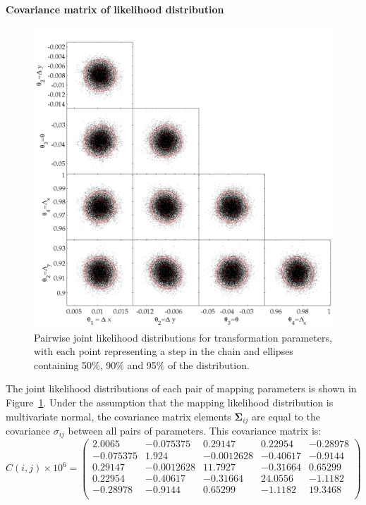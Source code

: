 \documentclass[manuscript]{aastex}
\newcommand{\bsS}{\boldsymbol\Sigma}
\begin{document}
\paragraph{Covariance matrix of likelihood distribution}
\begin{figure}[h]
\centering
\includegraphics[width=\linewidth]{figures/jointL.pdf}
\caption{Pairwise joint likelihood distributions for transformation parameters, with each point representing a step in the chain and ellipses containing 50\%, 90\% and 95\% of the distribution.}\label{fig:jointL}
\end{figure}
The joint likelihood distributions of each pair of mapping parameters is shown in Figure~\ref{fig:jointL}. Under the assumption that the mapping likelihood distribution is multivariate normal, the covariance matrix elements $\bsS_{ij}$ are equal to the covariance $\sigma_{ij}$ between all pairs of parameters. This covariance matrix is:
\[ C(i,j)\times10^6 = \left(\begin{array}{ccccc}
2.0065&-0.075375&0.29147&0.22954&-0.28978\\
-0.075375&1.924&-0.0012628&-0.40617&-0.9144\\
0.29147&-0.0012628&11.7927&-0.31664&0.65299\\
0.22954&-0.40617&-0.31664&24.0556&-1.1182\\
-0.28978&-0.9144&0.65299&-1.1182&19.3468\\
\end{array}\right)\]
\end{document}
